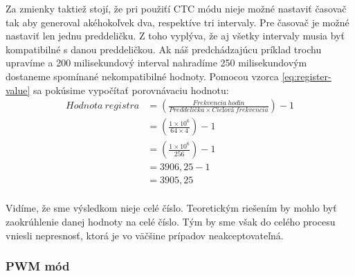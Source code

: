Za zmienky taktiež stojí, že pri použiťí CTC módu nieje možné nastaviť časovač tak aby generoval akéhokoľvek dva, respektíve tri intervaly. Pre časovač je možné nastaviť
len jednu preddeličku. Z toho vyplýva, že aj všetky intervaly musia byť kompatibilné s danou preddeličkou. Ak náš predchádzajúcu príklad trochu upravíme
a 200 milisekundový interval nahradíme 250 milisekundovým dostaneme spomínané nekompatibilné hodnoty. Pomocou vzorca \ref{eq:register-value} sa pokúsime vypočítať
porovnávaciu hodnotu:
\begin{equation}
    \begin{aligned}
        Hodnota\:registra & = (\frac{Frekvencia\:hodín}{Preddelička \times Cieľová\:frekvencia}) - 1 \\
                          & = (\frac{1 \times 10^{6}}{64 \times 4}) - 1                              \\
                          & = (\frac{1 \times 10^{6}}{256}) - 1                                      \\
                          & = 3906,25 - 1                                                            \\
                          & = 3905,25                                                                \\
    \end{aligned}
\end{equation}

Vidíme, že sme výsledkom nieje celé číslo. Teoretickým riešením by mohlo byť zaokrúhlenie danej hodnoty na celé číslo. Tým by sme však do celého procesu vniesli nepresnosť,
ktorá je vo väčšine prípadov neakceptovateľná.

\subsubsection{PWM mód}
